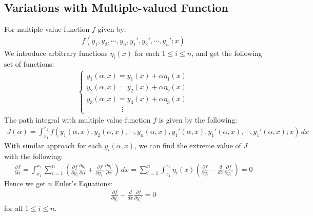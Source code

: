 \documentclass[11pt,oneside]{book}
\theoremstyle{break}
\theoremstyle{break}
\begin{document}
\subsection*{Variations with Multiple-valued Function}
For multiple value function $f$ given by:
\begin{align*}
f(y_1,y_2,\cdots, y_n, y_1',y_2',\cdots, y_n'; x)
\end{align*}
We introduce arbitrary functions $\eta_i(x)$ for each $1\leq i \leq n$, and get the following set of functions:
\begin{align*}
\begin{cases}
y_1(\alpha,x) = y_1(x) + \alpha \eta_1 (x) \\
y_2(\alpha,x) = y_2(x) + \alpha \eta_2 (x) \\
y_3(\alpha,x) = y_3(x) + \alpha \eta_3 (x) \\
\qquad\qquad\ \ \ \ \vdots
\end{cases}
\end{align*}
The path integral with multiple value function $f$ is given by the following:
\begin{align*}
J(\alpha) = \int_{x_1}^{x_2} f(y_1(\alpha,x),y_2(\alpha,x),\cdots, y_n(\alpha,x), y_1'(\alpha,x),y_1'(\alpha,x),\cdots, y_1'(\alpha,x);x) \, dx
\end{align*} 
With similar approach for each $y_i(\alpha,x)$, we can find the extreme value of $J$ with the following:
\begin{align*}
\frac{\partial J}{\partial \alpha} = \int_{x_1}^{x_2} \sum_{i=1}^n \left(\frac{\partial f}{\partial y_i}\frac{\partial y_i}{\partial \alpha}+ \frac{\partial f}{\partial y_i'}\frac{\partial y_i'}{\partial \alpha} \right)\, dx = \sum_{i=1}^n \int_{x_1}^{x_2} \eta_i(x) \left( \frac{\partial f}{\partial y_i} - \frac{d}{dx}\frac{\partial f}{\partial y_i'}\right) = 0
\end{align*}
Hence we get $n$ Euler's Equations:
\begin{align*}
\frac{\partial f}{\partial y_i}-\frac{d}{dx}\frac{\partial f}{\partial y_i'} = 0
\end{align*}
for all $1\leq i \leq n$. \\
\end{document}
